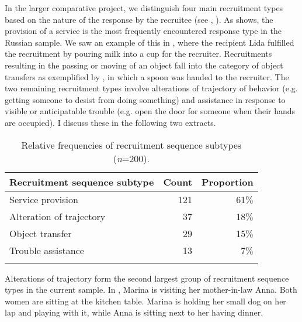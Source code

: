\documentclass[output=paper,modfonts,nonflat]{langsci/langscibook}
\begin{document}
In the larger comparative project, we distinguish four main recruitment types based on the nature of the response by the recruitee (see , ). As  shows, the provision of a service is the most frequently encountered response type in the Russian sample. We saw an example of this in , where the recipient Lida fulfilled the recruitment by pouring milk into a cup for the recruiter. Recruitments resulting in the passing or moving of an object fall into the category of object transfers as exemplified by , in which a spoon was handed to the recruiter. The two remaining recruitment types involve alterations of trajectory of behavior (e.g. getting someone to desist from doing something) and assistance in response to visible or anticipatable trouble (e.g. open the door for someone when their hands are occupied). I discuss these in the following two extracts.

\begin{table}
\begin{tabularx}{.75\textwidth}{Xrr}
\lsptoprule
Recruitment sequence subtype & Count & Proportion\\
\midrule
Service provision & 121 & 61\%\\
Alteration of trajectory & 37 & 18\%\\
Object transfer & 29 & 15\%\\
Trouble assistance & 13 & 7\%\\
\lspbottomrule
\end{tabularx}
\caption{Relative frequencies of recruitment sequence subtypes (\textit{n}=200).}
\label{tab:baranova:1}
\end{table}

\hspace*{-1.2mm}Alterations of trajectory form the second largest group of recruitment sequence types in the current sample. In , Marina is visiting her mother-in-law Anna. Both women are sitting at the kitchen table. Marina is holding her small dog on her lap and playing with it, while Anna is sitting next to her having dinner.
\end{document}
